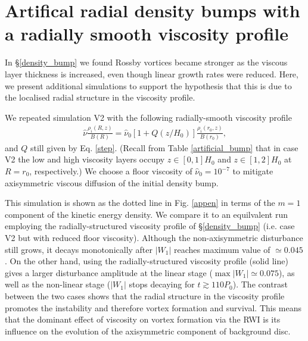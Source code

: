 {\bf
  \section{Artifical radial density bumps with a radially smooth
    viscosity profile}\label{add_sim}
  In \S\ref{density_bump} we found Rossby vortices became stronger
  as the viscous layer thickness is increased, even though linear growth rates
  were reduced. Here, we present additional simulations to support the 
  hypothesis that this is due to the localised radial structure in the viscosity profile. 


  We repeated simulation V2 with the following radially-smooth
  viscosity profile      
  \begin{align}\label{smooth_visc}          
    \hat{\nu}\frac{\rho_i       (R,z)}{B(R)} =
    \hat{\nu}_0\left[1+Q(z/H_0) \right]\frac{\rho_i(r_0,z)}{B(r_0)},
  \end{align}                   
  and $Q$ still given by Eq. \ref{step}. 
  (Recall from Table \ref{artificial_bump} that in
  case V2 the low
  and high viscosity layers occupy $z\in[0,1]H_0$  and
  $z\in[1,2]H_0$ at $R=r_0$, respectively.) We choose a floor viscosity
  of $\hat{\nu}_0=10^{-7}$ to mitigate axisymmetric viscous diffusion of 
  the initial density bump. 

  This simulation is shown as the dotted line in Fig. \ref{appen} 
  in terms of the $m=1$ component of the kinetic energy density. We compare it to an equilvalent run
  employing the radially-structured viscosity profile  of \S\ref{density_bump} (i.e. case V2 
  but with reduced floor viscosity). Although the non-axisymmetric disturbance still grows, it decays 
  monotonically after $|W_1|$ reaches maximum value of $\simeq 0.045$. On the other hand,  
  using the radially-structured viscosity profile (solid line) gives a larger disturbance amplitude at
  the linear stage  ($\max{|W_1|}\simeq0.075$), as well as  the non-linear stage ($|W_1|$ stops decaying for $t\gtrsim110P_0$). 
  The contrast between the two cases shows that the radial structure in the viscosity profile promotes the instability and therefore vortex
  formation and survival. This means that the dominant effect of viscosity on vortex formation via the RWI is its influence on the evolution 
of the axisymmetric component of background disc. 


}
